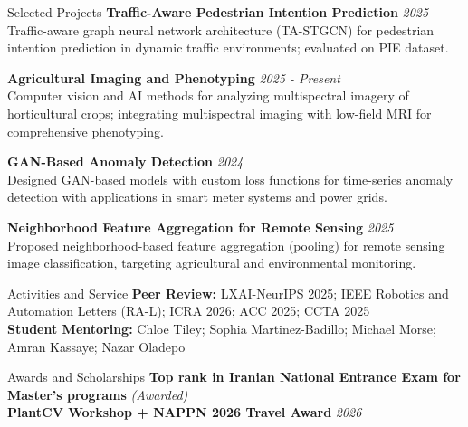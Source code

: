 \documentclass{resume} %
\begin{document}
\begin{rSection}{Selected Projects}
{\bf Traffic-Aware Pedestrian Intention Prediction} \hfill {\em 2025}\\
Traffic-aware graph neural network architecture (TA-STGCN) for pedestrian intention prediction in dynamic traffic environments; evaluated on PIE dataset.

{\bf Agricultural Imaging and Phenotyping} \hfill {\em 2025 - Present}\\
Computer vision and AI methods for analyzing multispectral imagery of horticultural crops; integrating multispectral imaging with low-field MRI for comprehensive phenotyping.

{\bf GAN-Based Anomaly Detection} \hfill {\em 2024}\\
Designed GAN-based models with custom loss functions for time-series anomaly detection with applications in smart meter systems and power grids.

{\bf Neighborhood Feature Aggregation for Remote Sensing} \hfill {\em 2025}\\
Proposed neighborhood-based feature aggregation (pooling) for remote sensing image classification, targeting agricultural and environmental monitoring.
\end{rSection}

\begin{rSection}{Activities and Service}
{\bf Peer Review:} LXAI-NeurIPS 2025; IEEE Robotics and Automation Letters (RA-L); ICRA 2026; ACC 2025; CCTA 2025\\
{\bf Student Mentoring:} Chloe Tiley; Sophia Martinez-Badillo; Michael Morse; Amran Kassaye; Nazar Oladepo
\end{rSection}

\begin{rSection}{Awards and Scholarships}
{\bf Top rank in Iranian National Entrance Exam for Master's programs} \hfill {\em (Awarded)}\\
{\bf PlantCV Workshop + NAPPN 2026 Travel Award} \hfill {\em 2026}
\end{rSection}
\end{document}
